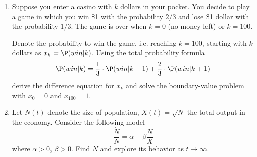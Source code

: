\documentclass[12pt]{article} %
\theoremstyle{definition} %
\begin{document}
\begin{enumerate}[resume]
\item Suppose you enter a casino with $k$ dollars in your pocket. You decide to play a game in which you win \$1 with the probability  $2/3$ and lose \$1 dollar with the probability $1/3$. The game is over when $k=0$ (no money left) or $k=100$.

Denote the probability to win the game, i.e. reaching $k=100$, starting with $k$ dollars as $x_k=\P(win|k)$. Using the total probability formula
\[
\P(win|k)=\frac{1}{3} \cdot \P(win|k-1)+\frac{2}{3} \cdot \P(win|k+1)
\]
derive the difference equation for $x_k$ and solve the boundary-value problem with $x_0=0$ and $x_{100}=1$.

\item Let $N(t)$ denote the size of population, $X(t)=\sqrt{N}$ the total output in the economy. Consider the following model
\[
\frac{\dot{N}}{N}=\alpha-\beta\frac{N}{X}
\]
where $\alpha>0$, $\beta>0$. Find $N$ and explore its behavior as $t\to\infty$.
\end{enumerate}
\end{document}
